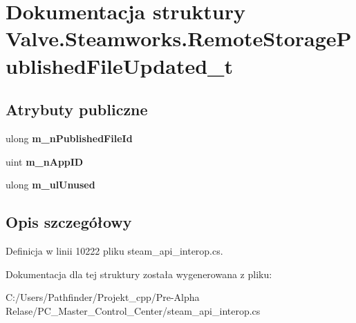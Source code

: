 \hypertarget{struct_valve_1_1_steamworks_1_1_remote_storage_published_file_updated__t}{}\section{Dokumentacja struktury Valve.\+Steamworks.\+Remote\+Storage\+Published\+File\+Updated\+\_\+t}
\label{struct_valve_1_1_steamworks_1_1_remote_storage_published_file_updated__t}
\subsection*{Atrybuty publiczne}
\begin{DoxyCompactItemize}
\item 
\mbox{\label{struct_valve_1_1_steamworks_1_1_remote_storage_published_file_updated__t_a044d18c2de4bb362c1c033d0f6e97d71}} 
ulong {\bfseries m\+\_\+n\+Published\+File\+Id}
\item 
\mbox{\label{struct_valve_1_1_steamworks_1_1_remote_storage_published_file_updated__t_af761736959ece3fdce1c8963a52164d8}} 
uint {\bfseries m\+\_\+n\+App\+ID}
\item 
\mbox{\label{struct_valve_1_1_steamworks_1_1_remote_storage_published_file_updated__t_af0c00e4c60d8cdc6af41aa4a469d71b8}} 
ulong {\bfseries m\+\_\+ul\+Unused}
\end{DoxyCompactItemize}


\subsection{Opis szczegółowy}


Definicja w linii 10222 pliku steam\+\_\+api\+\_\+interop.\+cs.



Dokumentacja dla tej struktury została wygenerowana z pliku\+:\begin{DoxyCompactItemize}
\item 
C\+:/\+Users/\+Pathfinder/\+Projekt\+\_\+cpp/\+Pre-\/\+Alpha Relase/\+P\+C\+\_\+\+Master\+\_\+\+Control\+\_\+\+Center/steam\+\_\+api\+\_\+interop.\+cs\end{DoxyCompactItemize}

